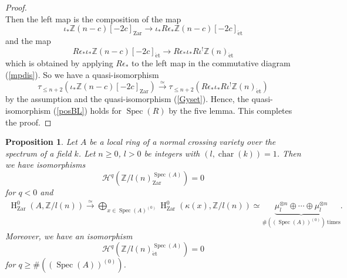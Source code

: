 \documentclass{article}
\newtheorem{prop}[thm]{\indent \sc Proposition}
\newcommand{\spec}{\operatorname{Spec}}
\newcommand{\et}{\mathrm{\acute{e}t}}
\newcommand{\Zar}{\mathrm{Zar}}
\newcommand{\HO}{\operatorname{H}}
\begin{document}
\begin{proof}
\begin{equation*}
\end{equation*}
%
Then the left map is the composition of the map
%
\begin{equation*}
\iota_{*}\mathbb{Z}(n-c)[-2c]_{\Zar}
\to 
\iota_{*}R\epsilon_{*}\mathbb{Z}(n-c)[-2c]_{\et}
\end{equation*}
%
and the map
%
\begin{equation*}
R\epsilon_{*}\iota_{*}\mathbb{Z}(n-c)[-2c]_{\et}
\to
R\epsilon_{*}\iota_{*}R\iota^{!}\mathbb{Z}(n)_{\et}
\end{equation*}
%
which is obtained by applying $R\epsilon_{*}$ to the left map in 
the commutative diagram (\ref{mpdis}).
So we have a quasi-isomorphism
%
\begin{equation*}
\tau_{\leq n+2}\left(
\iota_{*}\mathbb{Z}(n-c)[-2c]_{\Zar}
\right)
\xrightarrow{\simeq}
\tau_{\leq n+2}\left(
R\epsilon_{*}\iota_{*}R\iota^{!}\mathbb{Z}(n)_{\et}
\right)
\end{equation*}
%
by the assumption and the quasi-isomorphism (\ref{Gyset}). 
Hence, the quasi-isomorphism (\ref{posBL}) holds for $\spec(R)$ by the five lemma. 
This completes the proof.
\end{proof}
%

%
\begin{prop}\upshape\label{constm}
Let $A$ be a local ring of a normal crossing variety over the spectrum of  
a field $k$. Let $n\geq 0$, $l>0$ be integers with $(l, \operatorname{char}(k))=1$.
Then we have isomorphisms
%
\begin{equation}\label{Vanineg}
\mathcal{H}^{q}(\mathbb{Z}/l(n)_{\Zar}^{\spec(A)})=0    
\end{equation}
%
for $q<0$ and
%
\begin{align}\label{Zerods}
\HO^{0}_{\Zar}(
A, 
\mathbb{Z}/l(n)
)  
\xrightarrow{\simeq}
\bigoplus_{x\in\spec(A)^{(0)}}
\HO^{0}_{\Zar}(
\kappa(x),
\mathbb{Z}/l(n)
)
\simeq
\underbrace{
\mu_{l}^{\otimes n}
\oplus\cdots
\oplus
\mu_{l}^{\otimes n}
}_{\#\left((\spec(A))^{(0)}\right) ~ \textrm{times}}.
\end{align}
%
Moreover, we have an isomorphism
%
\begin{equation}\label{Vanipos}
\mathcal{H}^{q}(
\mathbb{Z}/l(n)_{\et}^{\spec(A)}
)    
=0
\end{equation}
%
for $q\geq\#\left((\spec(A))^{(0)}\right)$.
\end{prop}
%
\end{document}
